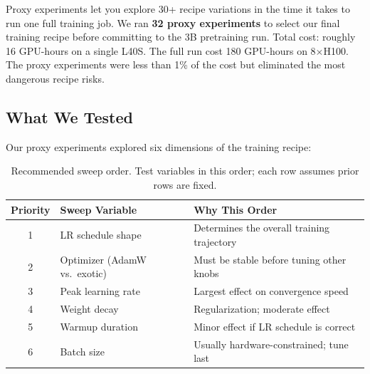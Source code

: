 \documentclass[11pt,a4paper]{article}
\begin{document}
\begin{keyidea}
Proxy experiments let you explore 30+ recipe variations in the time it takes to run one full training job. We ran \textbf{32 proxy experiments} to select our final training recipe before committing to the 3B pretraining run. Total cost: roughly 16 GPU-hours on a single L40S. The full run cost 180 GPU-hours on 8$\times$H100. The proxy experiments were less than 1\% of the cost but eliminated the most dangerous recipe risks.
\end{keyidea}

\subsection{What We Tested}

Our proxy experiments explored six dimensions of the training recipe:

\begin{table}[H]
\centering
\begin{tabular}{clp{6cm}}
\toprule
\textbf{Priority} & \textbf{Sweep Variable} & \textbf{Why This Order} \\
\midrule
1 & LR schedule shape & Determines the overall training trajectory \\
2 & Optimizer (AdamW vs.\ exotic) & Must be stable before tuning other knobs \\
3 & Peak learning rate & Largest effect on convergence speed \\
4 & Weight decay & Regularization; moderate effect \\
5 & Warmup duration & Minor effect if LR schedule is correct \\
6 & Batch size & Usually hardware-constrained; tune last \\
\bottomrule
\end{tabular}
\caption{Recommended sweep order. Test variables in this order; each row assumes prior rows are fixed.}
\end{table}
\end{document}
